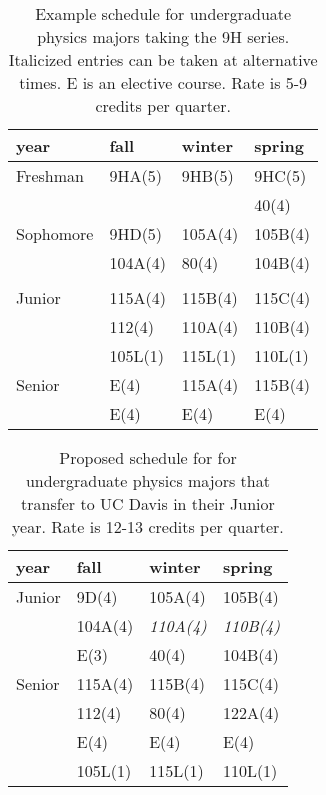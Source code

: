 \documentclass[12pt]{article}
\begin{document}
\begin{table}
\caption{Example schedule for undergraduate physics majors taking the 9H series. Italicized entries can be taken at alternative times.  E is an elective course.  Rate is 5-9 credits per quarter.}
\label{tbl:proposed-honors}
\begin{center}
\begin{tabular}{|l|l|l|l|}
\hline
year      & fall    & winter & spring \\
\hline
Freshman  & 9HA(5)  & 9HB(5)  & 9HC(5) \\
          &         &         & 40(4)  \\
\hline
Sophomore & 9HD(5)  & 105A(4) &  105B(4) \\
          & 104A(4) & 80(4)   &  104B(4) \\
          &         &         &  \\
\hline
Junior    & 115A(4) & 115B(4)  & 115C(4)\\
          & 112(4)  & 110A(4)  & 110B(4)\\
		  & 105L(1) & 115L(1)  & 110L(1)\\
\hline
Senior    & E(4)    & 115A(4)  & 115B(4) \\
          & E(4)    & E(4)     & E(4) \\

\hline  
\end{tabular}
\end{center}
\end{table}

\begin{table}

\caption{Proposed schedule for for undergraduate physics majors that transfer to UC Davis in their Junior year.  Rate is 12-13 credits per quarter.}
\label{tbl:proposed-transfers}
\begin{center}
\begin{tabular}{|l|l|l|l|}
\hline
year      & fall    & winter & spring \\
\hline
Junior   & 9D(4)     & 105A(4)       & 105B(4) \\
         & 104A(4)   & {\it 110A(4)} & {\it 110B(4)} \\         
         & E(3)      & 40(4)         & 104B(4) \\
\hline
Senior   & 115A(4)   & 115B(4)       & 115C(4) \\
         & 112(4)    & 80(4)         & 122A(4) \\
         & E(4)      & E(4)          & E(4)  \\
		 & 105L(1)  & 115L(1)        & 110L(1) \\


\hline 
\end{tabular}
\end{center}
\end{table}
\end{document}
